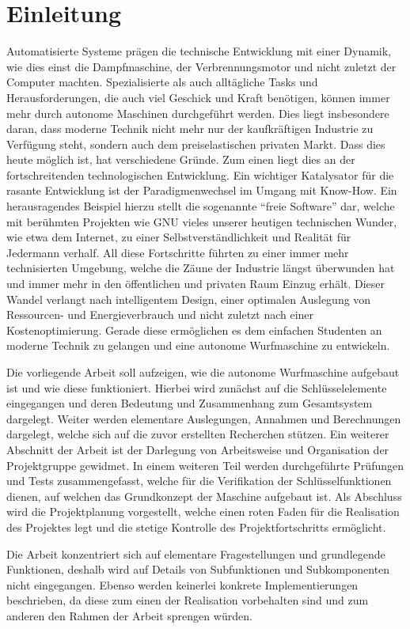 \section{Einleitung}
Automatisierte Systeme prägen die technische Entwicklung mit einer Dynamik,
wie dies einst die Dampfmaschine, der Verbrennungsmotor und nicht zuletzt der
Computer machten. Spezialisierte als auch alltägliche Tasks und 
Herausforderungen, die auch viel Geschick und Kraft benötigen, können immer
mehr durch autonome Maschinen durchgeführt werden. Dies liegt insbesondere
daran, dass moderne Technik nicht mehr nur der kaufkräftigen Industrie zu
Verfügung steht, sondern auch dem preiselastischen privaten Markt. Dass dies
heute möglich ist, hat verschiedene Gründe. Zum einen liegt dies an der
fortschreitenden technologischen Entwicklung. Ein wichtiger Katalysator für
die rasante Entwicklung ist der Paradigmenwechsel im Umgang mit Know-How.
Ein herausragendes Beispiel hierzu stellt die sogenannte 
``freie Software'' dar, welche mit berühmten Projekten wie GNU vieles
unserer heutigen technischen Wunder, wie etwa dem Internet, zu einer
Selbstverständlichkeit und Realität für Jedermann verhalf.
All diese Fortschritte führten zu einer immer mehr technisierten
Umgebung, welche die Zäune der Industrie längst überwunden hat und immer
mehr in den öffentlichen und privaten Raum Einzug erhält. Dieser Wandel
verlangt nach intelligentem Design, einer optimalen Auslegung von
Ressourcen- und Energieverbrauch und nicht zuletzt nach einer
Kostenoptimierung. Gerade diese ermöglichen es dem einfachen Studenten an
moderne Technik zu gelangen und eine autonome Wurfmaschine zu
entwickeln. 

Die vorliegende Arbeit soll aufzeigen, wie die autonome Wurfmaschine
aufgebaut ist und wie diese funktioniert. Hierbei wird zunächst auf die
Schlüsselelemente eingegangen und deren Bedeutung und Zusammenhang
zum Gesamtsystem dargelegt. Weiter werden elementare Auslegungen, Annahmen
und Berechnungen dargelegt, welche sich auf die zuvor erstellten Recherchen
stützen. Ein weiterer Abschnitt der Arbeit ist der Darlegung von Arbeitsweise
und Organisation der Projektgruppe gewidmet. In einem weiteren Teil werden
durchgeführte Prüfungen und Tests zusammengefasst, welche für die Verifikation
der Schlüsselfunktionen dienen, auf welchen das Grundkonzept der Maschine
aufgebaut ist. Als Abschluss wird die Projektplanung vorgestellt, welche
einen roten Faden für die Realisation des Projektes legt und die stetige
Kontrolle des Projektfortschritts ermöglicht.

Die Arbeit konzentriert sich auf elementare Fragestellungen und grundlegende
Funktionen, deshalb wird auf Details von Subfunktionen und Subkomponenten
nicht eingegangen. Ebenso werden keinerlei konkrete Implementierungen 
beschrieben, da diese zum einen der Realisation vorbehalten sind und zum
anderen den Rahmen der Arbeit sprengen würden.

